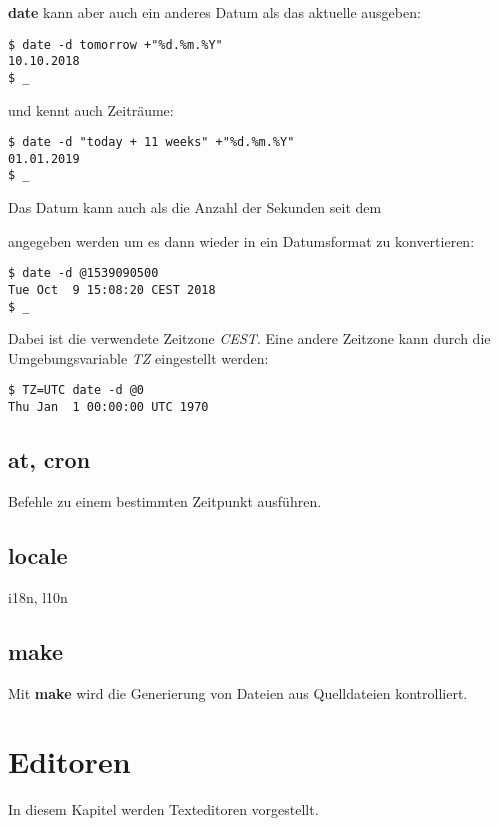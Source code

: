 \documentclass[titlepage,a4paper]{article}
\begin{document}
\noindent
\textbf{date} kann aber auch ein anderes Datum als das aktuelle ausgeben:

\begin{verbatim}
$ date -d tomorrow +"%d.%m.%Y"
10.10.2018
$ _
\end{verbatim}

\noindent
und kennt auch Zeiträume:

\begin{verbatim}
$ date -d "today + 11 weeks" +"%d.%m.%Y"
01.01.2019
$ _
\end{verbatim}

\noindent
Das Datum kann auch als die Anzahl der Sekunden seit dem \date{1.1.1970} 
angegeben werden um es dann wieder in ein Datumsformat zu konvertieren:

\begin{verbatim}
$ date -d @1539090500
Tue Oct  9 15:08:20 CEST 2018
$ _
\end{verbatim}

Dabei ist die verwendete Zeitzone \emph{CEST}.  Eine andere Zeitzone kann
durch die Umgebungsvariable \emph{TZ} eingestellt werden:

\begin{verbatim}
$ TZ=UTC date -d @0
Thu Jan  1 00:00:00 UTC 1970
\end{verbatim}

\subsection{at, cron}

Befehle zu einem bestimmten Zeitpunkt ausführen.

\subsection{locale}

i18n, l10n

\subsection{make}

Mit \textbf{make} wird die Generierung von Dateien aus Quelldateien 
kontrolliert.

\section{Editoren}

In diesem Kapitel werden Texteditoren vorgestellt.
\end{document}
